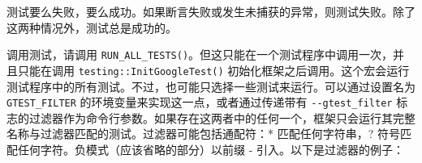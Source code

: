 测试要么失败，要么成功。如果断言失败或发生未捕获的异常，则测试失败。除了这两种情况外，测试总是成功的。

调用测试，请调用 \verb|RUN_ALL_TESTS()|。但这只能在一个测试程序中调用一次，并且只能在调用 \verb|testing::InitGoogleTest()| 初始化框架之后调用。这个宏会运行测试程序中的所有测试。不过，也可能只选择一些测试来运行。可以通过设置名为 \verb|GTEST_FILTER| 的环境变量来实现这一点，或者通过传递带有 \verb|--gtest_filter| 标志的过滤器作为命令行参数。如果存在这两者中的任何一个，框架只会运行其完整名称与过滤器匹配的测试。过滤器可能包括通配符：* 匹配任何字符串，? 符号匹配任何字符。负模式（应该省略的部分）以前缀 - 引入。以下是过滤器的例子：

